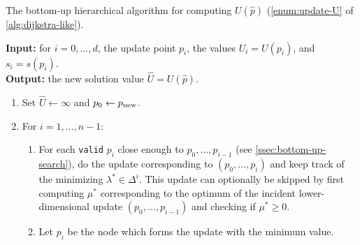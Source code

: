 \documentclass[eikonal.tex]{subfiles}
\begin{document}
\begin{algorithm}[H]
  \caption{The bottom-up hierarchical algorithm for computing
    $U(\hat{p})$ (\cref{enum:update-U} of
    \cref{alg:dijkstra-like}).}\label{alg:bottom-up}
  \textbf{Input:} for $i = 0, \hdots, d$, the update point $p_i$, the
  values
  $U_i = U(p_i)$, and $s_i = s(p_i)$. \\
  \textbf{Output:} the new solution value $\hat{U} = U(\hat{p})$.
  \begin{enumerate}[nolistsep]
  \item Set $\hat{U} \gets \infty$ and $p_0 \gets p_{\operatorname{new}}$.
  \item For $i = 1, \hdots, n - 1$:
    \begin{enumerate}
    \item For each \texttt{valid} $p_i$ close enough to
      $p_0, \hdots, p_{i-1}$ (see \cref{ssec:bottom-up-search}), do
      the update corresponding to $(p_0, \hdots, p_i)$ and keep track
      of the minimizing $\lambda^* \in \Delta^i$. This update can
      optionally be skipped by first computing $\mu^*$ corresponding
      to the optimum of the incident lower-dimensional update
      $(p_0, \hdots, p_{i-1})$ and checking if
      $\mu^* \geq 0$.\label{item:bottom-up-for}
    \item Let $p_i$ be the node which forms the update with the
      minimum value.
    \end{enumerate}
  \end{enumerate}
\end{algorithm}
\end{document}
